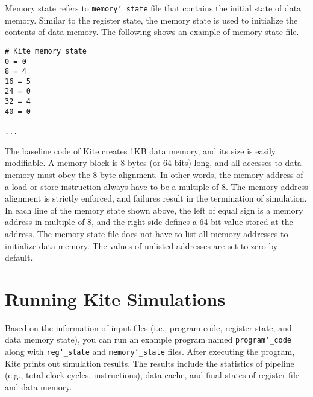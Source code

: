 \documentclass[10pt]{article}
\begin{document}
Memory state refers to {\tt memory\char`_state} file that contains the initial state of data memory.
Similar to the register state, the memory state is used to initialize the contents of data memory.
The following shows an example of memory state file.

\begin{Verbatim}[frame=single,fontsize=\small]
# Kite memory state
0 = 0
8 = 4
16 = 5
24 = 0
32 = 4
40 = 0

...

\end{Verbatim}

The baseline code of Kite creates 1KB data memory, and its size is easily modifiable.
A memory block is 8 bytes (or 64 bits) long, and all accesses to data memory must obey the 8-byte alignment.
In other words, the memory address of a load or store instruction always have to be a multiple of 8.
The memory address alignment is strictly enforced, and failures result in the termination of simulation.
In each line of the memory state shown above, the left of equal sign is a memory address in multiple of 8, and the right side defines a 64-bit value stored at the address.
The memory state file does not have to list all memory addresses to initialize data memory.
The values of unlisted addresses are set to zero by default.

\section{Running Kite Simulations} \label{sec:running}
Based on the information of input files (i.e., program code, register state, and data memory state), you can run an example program named {\tt program\char`_code} along with {\tt reg\char`_state} and {\tt memory\char`_state} files.
After executing the program, Kite prints out simulation results.
The results include the statistics of pipeline (e.g., total clock cycles, instructions), data cache, and final states of register file and data memory.
\end{document}
